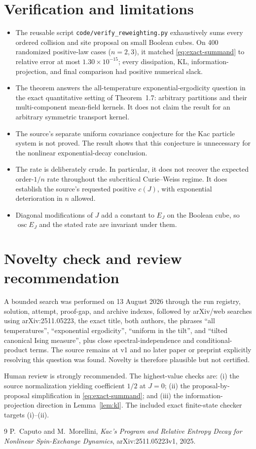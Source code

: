 \documentclass[11pt]{article}
\newcommand{\osc}{\operatorname{osc}}
\begin{document}
\section{Verification and limitations}

\begin{itemize}
\item The reusable script \texttt{code/verify\_reweighting.py} exhaustively
  sums every ordered collision and site proposal on small Boolean cubes.  On
  400 randomized positive-law cases ($n=2,3$), it matched
  \eqref{eq:exact-summand} to relative error at most
  $1.30\times10^{-15}$; every dissipation, KL, information-projection, and
  final comparison had positive numerical slack.
\item The theorem answers the all-temperature exponential-ergodicity question
  in the exact quantitative setting of Theorem~1.7: arbitrary partitions and
  their multi-component mean-field kernels.  It does not claim the result for
  an arbitrary symmetric transport kernel.
\item The source's separate uniform covariance conjecture for the Kac particle
  system is not proved.  The result shows that this conjecture is unnecessary
  for the nonlinear exponential-decay conclusion.
\item The rate is deliberately crude.  In particular, it does not recover the
  expected order-$1/n$ rate throughout the subcritical Curie--Weiss regime.
  It does establish the source's requested positive $c(J)$, with exponential
  deterioration in $n$ allowed.
\item Diagonal modifications of $J$ add a constant to $E_J$ on the Boolean
  cube, so $\osc E_J$ and the stated rate are invariant under them.
\end{itemize}

\section{Novelty check and review recommendation}

A bounded search was performed on 13 August 2026 through the run registry,
solution, attempt, proof-gap, and archive indexes, followed by arXiv/web
searches using arXiv:2511.05223, the exact title, both authors, the phrases
``all temperatures'', ``exponential ergodicity'', ``uniform in the tilt'',
and ``tilted canonical Ising measure'', plus close spectral-independence and
conditional-product terms.  The source remains at v1 and no later paper or
preprint explicitly resolving this question was found.  Novelty is therefore
plausible but not certified.

Human review is strongly recommended.  The highest-value checks are:
(i) the source normalization yielding coefficient $1/2$ at $J=0$;
(ii) the proposal-by-proposal simplification in
\eqref{eq:exact-summand}; and (iii) the information-projection direction in
Lemma~\ref{lem:kl}.  The included exact finite-state checker targets (i)--(ii).

\begin{thebibliography}{9}
P.~Caputo and M.~Morellini,
\emph{Kac's Program and Relative Entropy Decay for Nonlinear Spin-Exchange
Dynamics}, arXiv:2511.05223v1, 2025.
\end{thebibliography}
\end{document}
